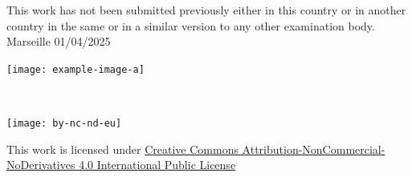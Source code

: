     This work has not been submitted previously either in this country or in another country in the same or in a similar version to any other examination body.\\
    
    Marseille 01/04/2025
    
    \begin{flushright}\texttt{[image: example-image-a]}\end{flushright}%

    ~\vfill
    \begin{center}
        \begin{minipage}[c]{0.25\linewidth}
            \texttt{[image: by-nc-nd-eu]}
        \end{minipage}\hfill
    \end{center}

    This work is licensed under \href{https://creativecommons.org/licenses/by-nc-nd/4.0/deed.en}{Creative Commons Attribution-NonCommercial-NoDerivatives 4.0 International Public License}
\fi

